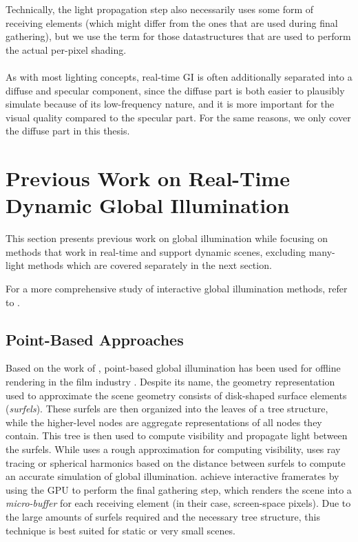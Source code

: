 Technically, the light propagation step also necessarily uses some form of receiving elements (which might differ from the ones that are used during final gathering), but we use the term for those datastructures that are used to perform the actual per-pixel shading.
\\
\\
As with most lighting concepts, real-time GI is often additionally separated into a diffuse and specular component, since the diffuse part is both easier to plausibly simulate because of its low-frequency nature, and it is more important for the visual quality compared to the specular part. For the same reasons, we only cover the diffuse part in this thesis.



\section{Previous Work on Real-Time Dynamic Global Illumination}

This section presents previous work on global illumination while focusing on methods that work in real-time and support dynamic scenes, excluding many-light methods which are covered separately in the next section.

For a more comprehensive study of interactive global illumination methods, refer to \citet{Ritschel:2012:GISTAR}.

\subsection{Point-Based Approaches}

Based on the work of \citet{Bunnell:2005:AO}, point-based global illumination has been used for offline rendering in the film industry \citep{christensen2008point}.
Despite its name, the geometry representation used to approximate the scene geometry consists of disk-shaped surface elements (\emph{surfels}).
These surfels are then organized into the leaves of a tree structure, while the higher-level nodes are aggregate representations of all nodes they contain.
This tree is then used to compute visibility and propagate light between the surfels.
While \citet{Bunnell:2005:AO} uses a rough approximation for computing visibility, \citet{christensen2008point} uses ray tracing or spherical harmonics based on the distance between surfels to compute an accurate simulation of global illumination.
\citet{Ritschel:2009:microrendering} achieve interactive framerates by using the GPU to perform the final gathering step, which renders the scene into a \emph{micro-buffer} for each receiving element (in their case, screen-space pixels).
Due to the large amounts of surfels required and the necessary tree structure, this technique is best suited for static or very small scenes.



